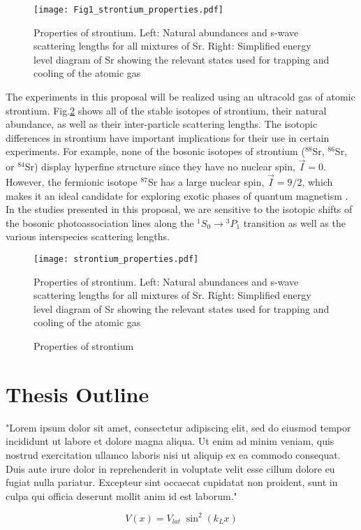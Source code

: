 	\begin{figure}
		\centerline{
		\texttt{[image: Fig1\_strontium\_properties.pdf]}}
		\caption{Properties of strontium. Left: Natural abundances and s-wave scattering lengths for all mixtures of Sr. Right: Simplified energy level diagram of Sr showing the relevant states used for trapping and cooling of the atomic gas}
		\label{fig:energy_level_diagram}
	\end{figure} 
The experiments in this proposal will be realized using an ultracold gas of atomic strontium. Fig.\;\ref{fig:energy_level_diagram} shows all of the stable isotopes of strontium, their natural abundance, as well as their inter-particle scattering lengths. The isotopic differences in strontium have important implications for their use in certain experiments. For example, none of the bosonic isotopes of strontium ($^{88}$Sr, $^{86}$Sr, or $^{84}$Sr) display hyperfine structure since they have no nuclear spin, $\vec{I}=0$. However, the fermionic isotope $^{87}$Sr has a large nuclear spin, $\vec{I}=9/2$, which makes it an ideal candidate for exploring exotic phases of quantum magnetism \cite{Beverland2016,Cazalilla2014,Chen2015}. In the studies presented in this proposal, we are sensitive to the isotopic shifts of the bosonic photoassociation lines along the $^1S_0\!\rightarrow\!^3P_1$ transition as well as the various interspecies scattering lengths.

\begin{figure}
\label{fig:energy_level_diagram}
	\centerline{
	\texttt{[image: strontium\_properties.pdf]}}
	\caption{Properties of strontium}{Properties of strontium. Left: Natural abundances and s-wave scattering lengths for all mixtures of Sr. Right: Simplified energy level diagram of Sr showing the relevant states used for trapping and cooling of the atomic gas}
\end{figure} 

\section{Thesis Outline}
\label{sec:outline}

"Lorem ipsum dolor sit amet, consectetur adipiscing elit, sed do eiusmod tempor incididunt ut labore et dolore magna aliqua. Ut enim ad minim veniam, quis nostrud exercitation ullamco laboris nisi ut aliquip ex ea commodo consequat. Duis aute irure dolor in reprehenderit in voluptate velit esse cillum dolore eu fugiat nulla pariatur. Excepteur sint occaecat cupidatat non proident, sunt in culpa qui officia deserunt mollit anim id est laborum."


\begin{equation} 
\label{eq:1dlattice}
		 V(x) = V_{lat} \; \sin^2(k_L x)
\end{equation}



